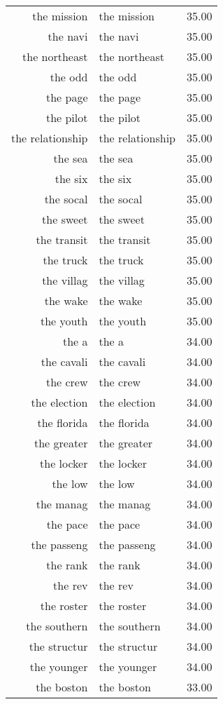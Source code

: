 \begin{table}[ht]
\begin{tabular}{rlr}
  the mission & the mission & 35.00 \\ 
  the navi & the navi & 35.00 \\ 
  the northeast & the northeast & 35.00 \\ 
  the odd & the odd & 35.00 \\ 
  the page & the page & 35.00 \\ 
  the pilot & the pilot & 35.00 \\ 
  the relationship & the relationship & 35.00 \\ 
  the sea & the sea & 35.00 \\ 
  the six & the six & 35.00 \\ 
  the socal & the socal & 35.00 \\ 
  the sweet & the sweet & 35.00 \\ 
  the transit & the transit & 35.00 \\ 
  the truck & the truck & 35.00 \\ 
  the villag & the villag & 35.00 \\ 
  the wake & the wake & 35.00 \\ 
  the youth & the youth & 35.00 \\ 
  the a & the a & 34.00 \\ 
  the cavali & the cavali & 34.00 \\ 
  the crew & the crew & 34.00 \\ 
  the election & the election & 34.00 \\ 
  the florida & the florida & 34.00 \\ 
  the greater & the greater & 34.00 \\ 
  the locker & the locker & 34.00 \\ 
  the low & the low & 34.00 \\ 
  the manag & the manag & 34.00 \\ 
  the pace & the pace & 34.00 \\ 
  the passeng & the passeng & 34.00 \\ 
  the rank & the rank & 34.00 \\ 
  the rev & the rev & 34.00 \\ 
  the roster & the roster & 34.00 \\ 
  the southern & the southern & 34.00 \\ 
  the structur & the structur & 34.00 \\ 
  the younger & the younger & 34.00 \\ 
  the boston & the boston & 33.00 \\ 

\end{tabular}
\end{table}
